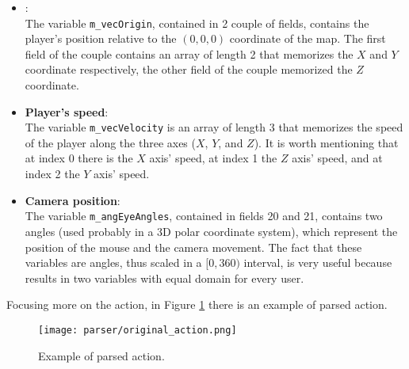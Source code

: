 	\begin{itemize}
	
		\item {}:\\			
			The variable \texttt{m\_vecOrigin}, contained in 2 couple of fields, contains the player's position relative to the $(0,0,0)$ coordinate of the map. 
			The first field of the couple contains an array of length 2 that memorizes the $X$ and $Y$ coordinate respectively, the other field of the couple memorized the $Z$ coordinate. \\
	
		\item \textbf{Player's speed}:\\
			The variable \texttt{m\_vecVelocity} is an array of length 3 that memorizes the speed of the player along the three axes ($X$, $Y$, and $Z$). 
			It is worth mentioning that at index 0 there is the $X$ axis' speed, at index 1 the $Z$ axis' speed, and at index 2 the $Y$ axis' speed.
	
		\item \textbf{Camera position}:\\
			The variable \texttt{m\_angEyeAngles}, contained in fields 20 and 21, contains two angles (used probably in a 3D polar coordinate system), which represent the position of the mouse and the camera movement. 
			The fact that these variables are angles, thus scaled in a $[0, 360)$ interval, is very useful because results in two variables with equal domain for every user. 
			
	\end{itemize}

	Focusing more on the action, in Figure \ref{fig:act2} there is an example of parsed action.
	
	\begin{figure}[!h] 
		\centering 
		\texttt{[image: parser/original\_action.png]}
		\caption{\label{fig:act2}Example of parsed action.}
	\end{figure}
	

